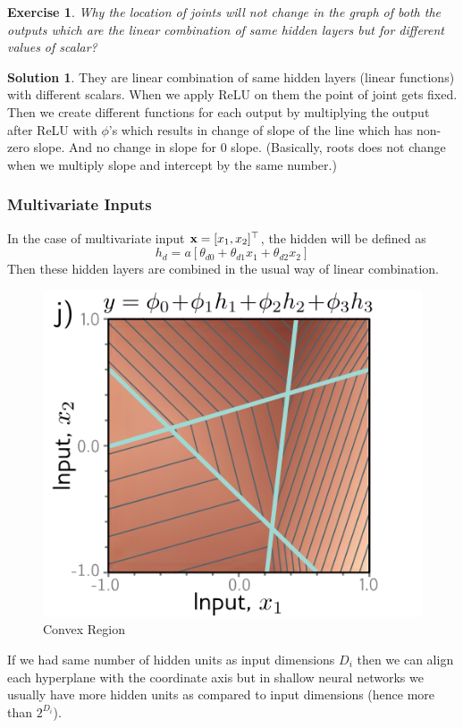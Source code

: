 \documentclass[12pt,reqno]{amsart}
\theoremstyle{plain}
\newtheorem{exer}{Exercise}
\theoremstyle{definition}
\newtheorem*{sol*}{Solution}
\begin{document}
\begin{exer}
Why the location of joints will not change in the graph of both the outputs which are the linear combination of same hidden layers but for different values of scalar?
\end{exer}
\begin{sol*}
    They are linear combination of same hidden layers (linear functions) with different scalars. When we apply ReLU on them the point of joint gets fixed. Then we create different functions for each output by multiplying the output after ReLU with $\phi$'s which results in change of slope of the line which has non-zero slope. And no change in slope for $0$ slope. (Basically, roots does not change when we multiply slope and intercept by the same number.)
\end{sol*}

\subsubsection{Multivariate Inputs}\label{multivariate-inputs}

In the case of multivariate input \({\bf x}=[x_1, x_2]^\top\), the hidden will be defined as
\[ h_d = a[\theta_{d0} + \theta_{d1}x_1 + \theta_{d2}x_2]\] Then these hidden layers are combined in the usual way of linear combination.

\begin{figure}[!ht]
    \centering
    \includegraphics[scale=.34]{../assets/dl/nn2input.png}
    \caption{Convex Region}
\end{figure}
If we had same number of hidden units as input dimensions $D_i$ then we can align each hyperplane with the coordinate axis but in shallow neural networks we usually have more hidden units as compared to input dimensions (hence more than $2^{D_i}$).
\end{document}
